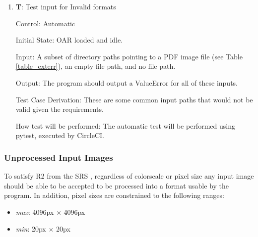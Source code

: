 \documentclass[12pt, titlepage]{article}
\newcounter{testnum} %
\begin{document}
\begin{enumerate}

  \item{\textbf{T\thetestnum \label{T_inputError}}: Test input for Invalid formats\\}
            
  Control: Automatic
            
  Initial State: OAR loaded and idle.
            
  Input: A subset of directory paths pointing to a PDF image file (see Table \ref{table_exterr}), an empty file path, and no file path.
            
  Output: The program should output a ValueError for all of these inputs.
            
  Test Case Derivation: These are some common input paths that would not be valid given the requirements.
            
  How test will be performed: The automatic test will be performed using pytest, executed by CircleCI.
\end{enumerate}

\subsubsection{Unprocessed Input Images}
To satisfy R2 from the SRS \citep{SRS}, regardless of colorscale or pixel size any input image should be able to be accepted to 
be processed into a format usable by the program. In addition, pixel sizes are constrained to the following ranges:

\begin{itemize}
  \item{\textit{max}: 4096px $\times$ 4096px}
  \item{\textit{min}: 20px $\times$ 20px}
\end{itemize}
\end{document}
